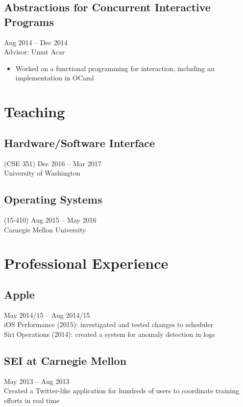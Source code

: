 \documentclass{article}
\begin{document}
\subsection{Abstractions for Concurrent Interactive Programs}
\hfill Aug 2014 -- Dec 2014 \\
Advisor: Umut Acar
\begin{itemize}
\item Worked on a functional programming for interaction, including an implementation in OCaml
\end{itemize}


\section{Teaching}

\subsection{Hardware/Software Interface} (CSE 351)
\hfill Dec 2016 -- Mar 2017\\
University of Washington

\subsection{Operating Systems} (15-410)
\hfill Aug 2015 -- May 2016 \\
Carnegie Mellon University

\section{Professional Experience}

\subsection{Apple}
\hfill May 2014/15 -- Aug 2014/15 \\
iOS Performance (2015): investigated and tested changes to scheduler \\
Siri Operations (2014): created a system for anomaly detection in logs

\subsection{SEI at Carnegie Mellon}
\hfill May 2013 -- Aug 2013 \\
Created a Twitter-like application for hundreds of users to coordinate training efforts in real time
\end{document}
